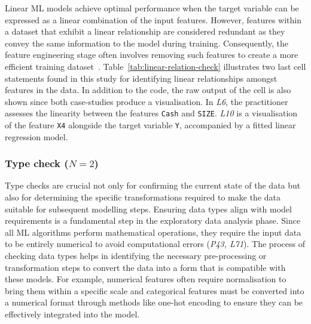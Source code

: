 Linear ML models achieve optimal performance when the target variable can be expressed as a linear combination of the input features. However, features within a dataset that exhibit a linear relationship are considered redundant as they convey the same information to the model during training. Consequently, the feature engineering stage often involves removing such features to create a more efficient training dataset~\cite{shome2022data}. Table~\ref{tab:linear-relation-check} illustrates two last cell statements found in this study for identifying linear relationships amongst features in the data. In addition to the code, the raw output of the cell is also shown since both case-studies produce a visualisation.  In \emph{L6}, the practitioner assesses the linearity between the features \texttt{Cash} and \texttt{SIZE}. \emph{L10} is a visualisation of the feature \texttt{X4} alongside the target variable \texttt{Y}, accompanied by a fitted linear regression model.


\subsubsection{Type check ($N = 2$)}

Type checks are crucial not only for confirming the current state of the data but also for determining the specific transformations required to make the data suitable for subsequent modelling steps. Ensuring data types align with model requirements is a fundamental step in the exploratory data analysis phase. Since all ML algorithms perform mathematical operations, they require the input data to be entirely numerical to avoid computational errors (\emph{P43, L71}). The process of checking data types helps in identifying the necessary pre-processing or transformation steps to convert the data into a form that is compatible with these models. For example, numerical features often require normalisation to bring them within a specific scale and categorical features must be converted into a numerical format through methods like one-hot encoding to ensure they can be effectively integrated into the model.

